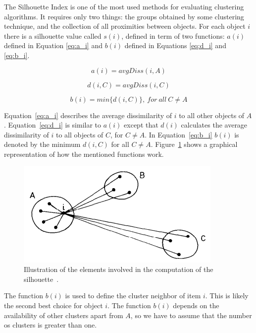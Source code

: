 \documentclass[conference]{IEEEtran}
\begin{document}
	
	The Silhouette Index is one of the most used methods for evaluating clustering algorithms. It requires only two things: the groups obtained by some clustering technique, and the collection of all proximities between objects. For each object $i$ there is a silhouette value called $s(i)$, defined in term of two functions: $a(i)$ defined in Equation \ref{eq:a_i} and $b(i)$ defined in Equations \ref{eq:d_i} and \ref{eq:b_i}.
	
	
	\begin{equation} \label{eq:a_i}
	a(i) = avgDiss(i, A)
	\end{equation}
	
	
	\begin{equation} \label{eq:d_i}
	d(i, C) = avgDiss(i, C)
	\end{equation}
	
	
	\begin{equation} \label{eq:b_i}
	b(i) = min\{d(i, C)\},~for~all~C \neq A
	\end{equation}
	
	Equation~\ref{eq:a_i} describes the average dissimilarity of $i$ to all other objects of $A$. Equation~\ref{eq:d_i} is similar to $a(i)$ except that $d(i)$ calculates the average dissimilarity of $i$ to all objects of $C$, for $C \neq A$. In Equation~\ref{eq:b_i} $b(i)$ is denoted by the minimum $d(i, C)$ for all $C \neq A$. Figure~\ref{fig:silhouette} shows a graphical representation of how the mentioned functions work.
	
	
	\begin{figure}[!htb]
		\centering
		\includegraphics[scale=.6]{figures/silhouette_img.png}
		\caption{Illustration of the elements involved in the computation of the silhouette~\cite{rousseeuw1987silhouettes}.}
		\label{fig:silhouette}
	\end{figure}
	
	
	The function $b(i)$ is used to define the cluster neighbor of item $i$. This is likely the second best choice for object $i$. The function $b(i)$ depends on the availability of other clusters apart from $A$, so we have to assume that the number os clusters is greater than one.
	
\end{document}
